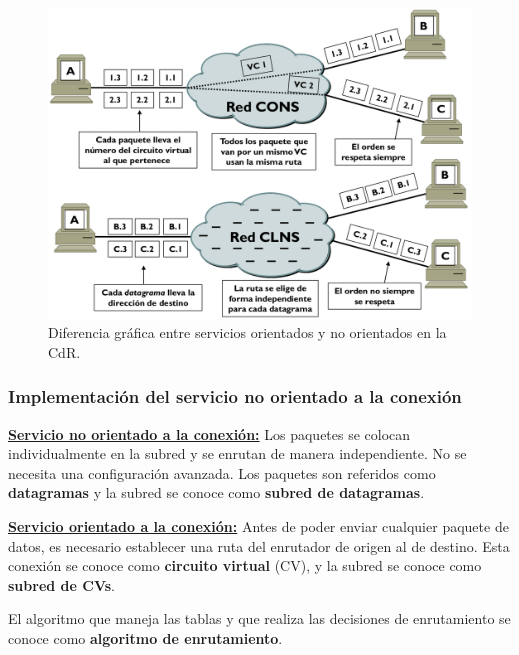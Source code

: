\documentclass[10pt,a4paper]{article}
\begin{document}
\begin{figure}[ht!]
  \caption{Diferencia gráfica entre servicios orientados y no orientados en la CdR.}
  \label{fig:redes_cons_clns}  
  \centerline{\includegraphics[width=0.8\textwidth-\fboxrule-\fboxrule]{imgs/redes_cons_clns.png}}  
\end{figure}

\subsubsection{Implementación del servicio no orientado a la conexión}

\underline{\textbf{{Servicio no orientado a la conexión:}}}
Los paquetes se colocan individualmente en la subred y se enrutan de manera independiente. No se necesita una configuración avanzada. Los paquetes son referidos como \textbf{datagramas} y la subred se conoce como \textbf{subred de datagramas}. 

\underline{\textbf{{Servicio orientado a la conexión:}}}
Antes de poder enviar cualquier paquete de datos, es necesario establecer una ruta del enrutador de origen al de destino. Esta conexión se conoce como \textbf{circuito virtual} (CV), y la subred se conoce como \textbf{subred de CVs}. 

El algoritmo que maneja las tablas y que realiza las decisiones de enrutamiento se conoce como \textbf{algoritmo de enrutamiento}.
\end{document}
